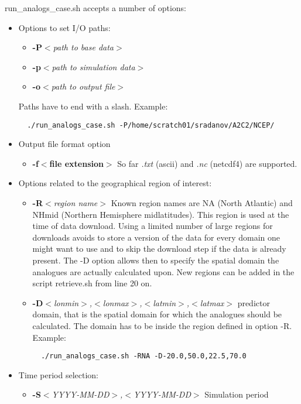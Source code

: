 \documentclass[11p,a4paper]{article}
\begin{document}
run\_analogs\_case.sh accepts a number of options:
\begin{itemize}
 \item Options to set I/O paths:
 \begin{itemize}
  \item \textbf{-P}\textit{$<$path to base data$>$}
  \item \textbf{-p}\textit{$<$path to simulation data$>$}
  \item \textbf{-o}\textit{$<$path to output file$>$}
 \end{itemize}
 Paths have to end with a slash.
 Example:
 \begin{verbatim}
  ./run_analogs_case.sh -P/home/scratch01/sradanov/A2C2/NCEP/
 \end{verbatim}
 \item Output file format option
 \begin{itemize}
  \item \textbf{-f}\textbf{$<$file extension$>$} So far \textit{.txt} (ascii) and  \textit{.nc} (netcdf4) are supported.
 \end{itemize}
 \item Options related to the geographical region of interest:
 \begin{itemize}
  \item \textbf{-R}\textit{$<$region name$>$} Known region names are NA (North Atlantic) and NHmid (Northern Hemisphere midlatitudes). This region is used at the time of data download. Using a limited number of large regions for downloads avoids to store a version of the data for every domain one might want to use and to skip the download step if the data is already present. The -D option allows then to specify the spatial domain the analogues are actually calculated upon. New regions can be added in the script retrieve.sh from line 20 on.
  \item \textbf{-D}\textit{$<$lonmin$>$,$<$lonmax$>$,$<$latmin$>$,$<$latmax$>$} predictor domain, that is the spatial domain for which the analogues should be calculated. The domain has to be inside the region defined in option -R. Example:
 \begin{verbatim}
  ./run_analogs_case.sh -RNA -D-20.0,50.0,22.5,70.0
 \end{verbatim}
 \end{itemize}
 \item Time period selection:
 \begin{itemize}
  \item \textbf{-S}\textit{$<$YYYY-MM-DD$>$,$<$YYYY-MM-DD$>$} Simulation period

\end{itemize}
\end{itemize}
\end{document}
